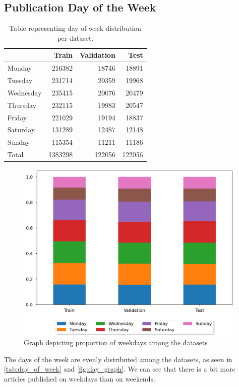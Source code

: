 \subsection{Publication Day of the Week}
\begin{table}[h]
    \centering\footnotesize\sf
    \begin{tabular}{lrrr}
        \toprule
        {}        & Train   & Validation & Test   \\
        \midrule
        Monday    & 216382  & 18746      & 18891  \\
        Tuesday   & 231714  & 20359      & 19968  \\
        Wednesday & 235415  & 20076      & 20479  \\
        Thursday  & 232115  & 19983      & 20547  \\
        Friday    & 221029  & 19194      & 18837  \\
        Saturday  & 131289  & 12487      & 12148  \\
        Sunday    & 115354  & 11211      & 11186  \\
        \midrule
        Total     & 1383298 & 122056     & 122056 \\
        \bottomrule
    \end{tabular}
    \caption{Table representing day of week distribution per dataset.}
\end{table}
\begin{figure}[h]
    \centering
    \includegraphics[width=.6\linewidth]{img/tasks_graph/day_of_week.png}
    \caption{Graph depicting proportion of weekdays among the datasets}
    \label{fig:day_graph}
\end{figure}
The days of the week are evenly distributed among the datasets, as seen in \autoref{tab:day_of_week} and \autoref{fig:day_graph}.
We can see that there is a bit more articles published on weekdays than on weekends.

